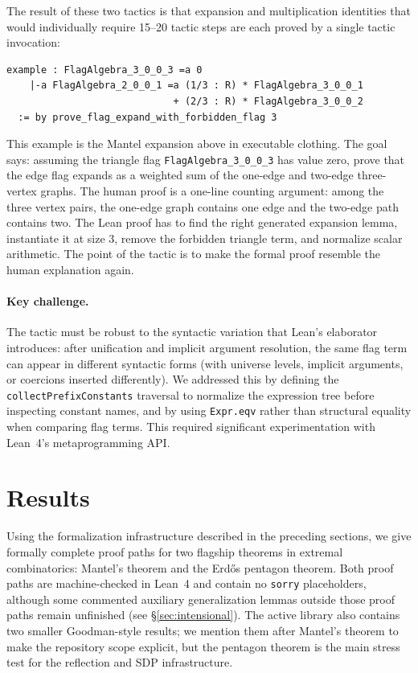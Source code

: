 \documentclass{article}
\newcommand{\lean}[1]{\texttt{#1}}
\begin{document}
The result of these two tactics is that expansion and multiplication identities
that would individually require 15--20 tactic steps are each proved by a single
tactic invocation:
\begin{lstlisting}
example : FlagAlgebra_3_0_0_3 =a 0
    |-a FlagAlgebra_2_0_0_1 =a (1/3 : R) * FlagAlgebra_3_0_0_1
                             + (2/3 : R) * FlagAlgebra_3_0_0_2
  := by prove_flag_expand_with_forbidden_flag 3
\end{lstlisting}

This example is the Mantel expansion above in executable clothing.  The goal
says: assuming the triangle flag \lean{FlagAlgebra\_3\_0\_0\_3} has value zero,
prove that the edge flag expands as a weighted sum of the one-edge and
two-edge three-vertex graphs.  The human proof is a one-line counting argument:
among the three vertex pairs, the one-edge graph contains one edge and the
two-edge path contains two.  The Lean proof has to find the right generated
expansion lemma, instantiate it at size $3$, remove the forbidden triangle
term, and normalize scalar arithmetic.  The point of the tactic is to make the
formal proof resemble the human explanation again.

\paragraph{Key challenge.}
The tactic must be robust to the syntactic variation that Lean's elaborator
introduces: after unification and implicit argument resolution, the same flag
term can appear in different syntactic forms (with universe levels, implicit
arguments, or coercions inserted differently).  We addressed this by defining
the \lean{collectPrefixConstants} traversal to normalize the expression tree
before inspecting constant names, and by using \lean{Expr.eqv} rather than
structural equality when comparing flag terms.  This required significant
experimentation with Lean~4's metaprogramming API.


\section{Results}
\label{sec:results}

Using the formalization infrastructure described in the preceding sections,
we give formally complete proof paths for two flagship theorems in extremal
combinatorics: Mantel's theorem and the Erd\H{o}s pentagon theorem.  Both
proof paths are machine-checked in Lean~4 and contain no \lean{sorry}
placeholders, although some commented auxiliary generalization lemmas outside
those proof paths remain unfinished (see \S\ref{sec:intensional}).  The active
library also contains two smaller Goodman-style results; we mention them after
Mantel's theorem to make the repository scope explicit, but the pentagon theorem
is the main stress test for the reflection and SDP infrastructure.
\end{document}
